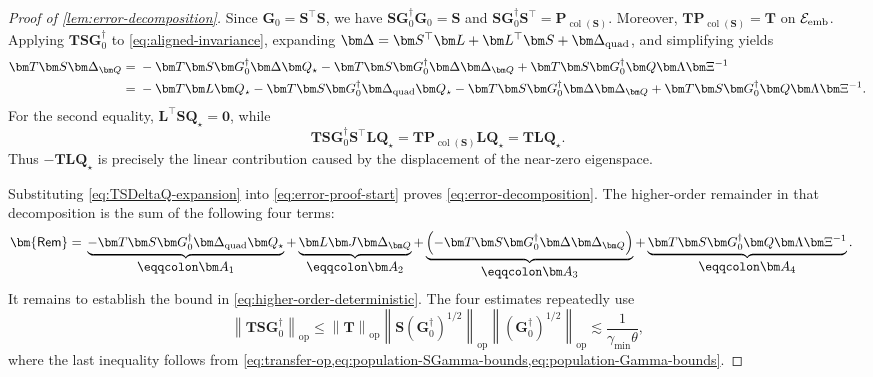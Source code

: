 \documentclass[11pt]{article}
\newcommand{\trans}{\top}
\DeclareMathOperator{\col}{col}
\newcommand{\opn}[1]{\left\lVert #1\right\rVert_{\mathrm{op}}}
\newcommand{\cE}{\mathcal{E}}
\newcommand{\bze}{\bm{0}}
\newcommand{\gmin}{\gamma_{\min}}
\begin{document}
\begin{proof}[Proof of \cref{lem:error-decomposition}]
Since $\bm G_0=\bm S^\trans\bm S$, we have
$\bm S\bm G_0^\dagger\bm G_0=\bm S$ and
$\bm S\bm G_0^\dagger\bm S^\trans
=\bm P_{\col(\bm S)}$. Moreover,
$\bm T\bm P_{\col(\bm S)}=\bm T$ on $\cE_{\rm emb}$. Applying
$\bm T\bm S\bm G_0^\dagger$ to
\cref{eq:aligned-invariance}, expanding
$\bm\Delta
=\bm S^\trans\bm L+\bm L^\trans\bm S+\bm\Delta_{\rm quad}$, and
simplifying yields
\begin{align}
  \bm T\bm S\bm\Delta_{\bm Q}
  ={}&
  -\bm T\bm S\bm G_0^\dagger
    \bm\Delta\bm Q_\star
  -\bm T\bm S\bm G_0^\dagger
    \bm\Delta\bm\Delta_{\bm Q}
  +
  \bm T\bm S\bm G_0^\dagger
    \bm Q\bm\Lambda\bm\Xi^{-1}
  \notag\\
  ={}&
  -\bm T\bm L\bm Q_\star
  -
  \bm T\bm S\bm G_0^\dagger
    \bm\Delta_{\rm quad}\bm Q_\star
  -
  \bm T\bm S\bm G_0^\dagger
    \bm\Delta\bm\Delta_{\bm Q}
  +
  \bm T\bm S\bm G_0^\dagger
    \bm Q\bm\Lambda\bm\Xi^{-1}.
\label{eq:TSDeltaQ-expansion}
\end{align}
For the second equality,
$\bm L^\trans\bm S\bm Q_\star=\bze$, while
\[
  \bm T\bm S\bm G_0^\dagger
  \bm S^\trans\bm L\bm Q_\star
  =
  \bm T\bm P_{\col(\bm S)}\bm L\bm Q_\star
  =
  \bm T\bm L\bm Q_\star.
\]
Thus $-\bm T\bm L\bm Q_\star$ is precisely the linear contribution caused
by the displacement of the near-zero eigenspace.

Substituting \cref{eq:TSDeltaQ-expansion} into
\cref{eq:error-proof-start} proves \cref{eq:error-decomposition}. The
higher-order remainder in that decomposition is the sum of the following four
terms:
\begin{equation}
\label{eq:error-higher-order-appendix}
\begin{aligned}
  \bm{\mathsf{Rem}}
  ={}&
  \underbrace{
    -\bm T\bm S\bm G_0^\dagger
    \bm\Delta_{\rm quad}\bm Q_\star
  }_{\displaystyle \eqqcolon\bm A_1}
  +
  \underbrace{
    \bm L\bm J\bm\Delta_{\bm Q}
  }_{\displaystyle \eqqcolon\bm A_2}
  +
  \underbrace{\left(
    -\bm T\bm S\bm G_0^\dagger
    \bm\Delta\bm\Delta_{\bm Q}
  \right)}_{\displaystyle \eqqcolon\bm A_3}
  +
  \underbrace{
    \bm T\bm S\bm G_0^\dagger
    \bm Q\bm\Lambda\bm\Xi^{-1}
  }_{\displaystyle \eqqcolon\bm A_4}.
\end{aligned}
\end{equation}
It remains to establish the bound in
\cref{eq:higher-order-deterministic}. The four estimates repeatedly use
\[
  \opn{\bm T\bm S\bm G_0^\dagger}
  \le
  \opn{\bm T}
  \opn{\bm S(\bm G_0^\dagger)^{1/2}}
  \opn{(\bm G_0^\dagger)^{1/2}}
  \lesssim
  \frac{1}{\gmin\theta},
\]
where the last inequality follows from
\cref{eq:transfer-op,eq:population-SGamma-bounds,eq:population-Gamma-bounds}.


\end{proof}
\end{document}
